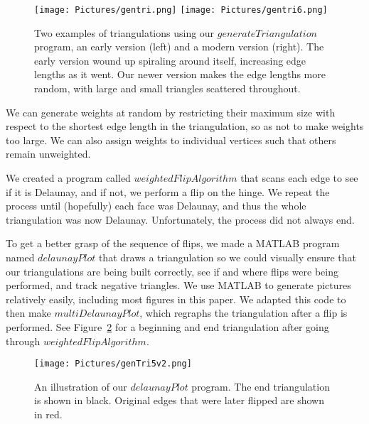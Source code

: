 \documentclass[12pt]{article}
\begin{document}
\begin{figure}
\centering
\texttt{[image: Pictures/gentri.png]}
\texttt{[image: Pictures/gentri6.png]}
\caption{Two examples of triangulations using our $generateTriangulation$ program, an early version (left) and a modern version (right). The early version wound up spiraling around itself, increasing edge lengths as it went. Our newer version makes the edge lengths more random, with large and small triangles scattered throughout.}
\label{genTris}
\end{figure}

 We can generate weights at random by restricting their maximum size with respect to the shortest edge length in the triangulation, so as not to make weights too large. We can also assign weights to individual vertices such that others remain unweighted. 

 We created a program called $weightedFlipAlgorithm$ that scans each edge to see if it is Delaunay, and if not, we perform a flip on the hinge. We repeat the process until (hopefully) each face was Delaunay, and thus the whole triangulation was now Delaunay. Unfortunately, the process did not always end. 

 To get a better grasp of the sequence of flips, we made a MATLAB program named $delaunayPlot$ that draws a triangulation so we could visually ensure that our triangulations are being built correctly, see if and where flips were being performed, and track negative triangles. We use MATLAB to generate pictures relatively easily, including most figures in this paper. We adapted this code to then make $multiDelaunayPlot$, which regraphs the triangulation after a flip is performed. See Figure~\ref{genTri5} for a beginning and end triangulation after going through $weightedFlipAlgorithm$. 

\begin{figure}
\centering
\texttt{[image: Pictures/genTri5v2.png]}
\caption{An illustration of our $delaunayPlot$ program. The end triangulation is shown in black. Original edges that were later flipped are shown in red.}
\label{genTri5}
\end{figure}
\end{document}
